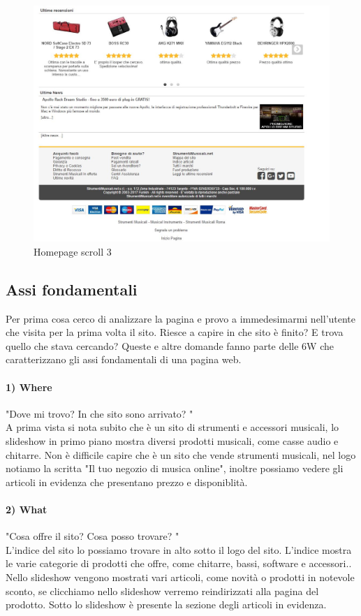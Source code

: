 \documentclass[12pt]{article}
\begin{document}
	\begin{figure}
		\centering	
		\includegraphics[width=160mm]{images/home3.png}%
		\caption{Homepage scroll 3}
	\end{figure}
	\newpage
	\subsection{Assi fondamentali}
	\vspace{0.5cm}
	Per prima cosa cerco di analizzare la pagina e provo a immedesimarmi nell'utente che visita per la prima volta il sito. Riesce a capire in che sito è finito? E trova quello che stava cercando?  Queste e altre domande fanno parte delle 6W che caratterizzano gli assi fondamentali di una pagina web.
	\paragraph{1) Where} "Dove mi trovo? In che sito sono arrivato? "
	\\ 
	A prima vista si nota subito che è un sito di strumenti e accessori musicali, lo slideshow in primo piano mostra diversi prodotti musicali, come casse audio e chitarre. Non è difficile capire che è un sito che vende strumenti musicali, nel logo notiamo la scritta "Il tuo negozio di musica online", inoltre possiamo vedere gli articoli in evidenza che presentano prezzo e disponiblità.
	\paragraph{2) What} "Cosa offre il sito? Cosa posso trovare? "
	\\
	L'indice del sito lo possiamo trovare in alto sotto il logo del sito. L'indice mostra le varie categorie di prodotti che offre, come chitarre, bassi, software e accessori.. \\ Nello slideshow vengono mostrati vari articoli, come novità o prodotti in notevole sconto, se clicchiamo nello slideshow verremo reindirizzati alla pagina del prodotto. Sotto lo slideshow è presente la sezione degli articoli in evidenza.
\end{document}

